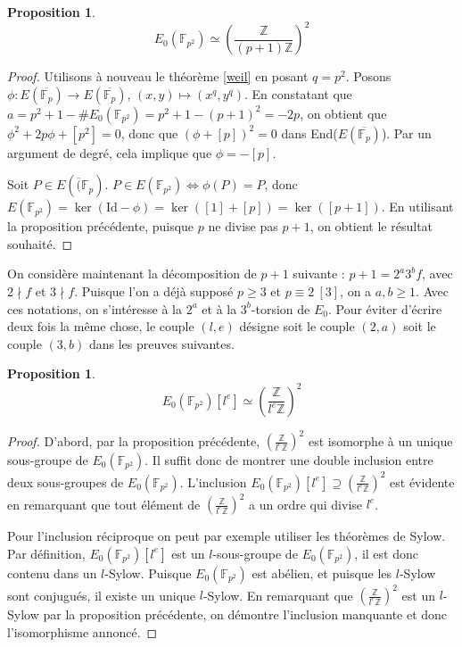 \documentclass{article}
\theoremstyle{plain}%
\newtheorem{prop}[thm]{Proposition}
\theoremstyle{definition}%
\newcommand{\Fq}{\mathbb{F}_{p^2}}
\newcommand{\F}{\mathbb{F}}
\newcommand{\Z}{\mathbb{Z}}
\begin{document}
\begin{prop}
  $$E_0(\F_{p^2}) \simeq \left(  \frac{\Z}{(p+1)\Z} \right)^2$$
\end{prop}
\begin{proof}
  Utilisons à nouveau le théorème \ref{weil} en posant $q = p^2$. 
  Posons $\phi : E(\overline{\F_p}) \to E(\overline{\F_p})$, $\left( x, y \right) \mapsto \left( x^{q}, y^{q} \right)$.
  En constatant que $a=p^2 + 1 - \#E_0(\F_{p^2}) = p^2 + 1 - \left( p + 1 \right) ^2 = -2p$, on obtient que $\phi^2 + 2p\phi + [p^2] = 0$, donc que $\left( \phi + [p] \right) ^2 = 0$ dans End($E(\overline{\F_p})$). 
  Par un argument de degré, cela implique que $\phi = -[p]$. 

  Soit $P\in E(\overline(\F_{p})$. $P \in E(\F_{p^2}) \iff \phi(P) = P$, donc $E(\F_{p^2}) = \ker(\text{Id} - \phi) = \ker([1] + [p]) = \ker([p+1])$.
  En utilisant la proposition précédente, puisque $p$ ne divise pas $p+1$, on obtient le résultat souhaité.
\end{proof}

On considère maintenant la décomposition de $p + 1$ suivante : $p + 1 = 2^a 3^b f$, avec $2 \nmid f$ et $3 \nmid f$. Puisque l'on a déjà supposé $p\ge 3$ et $p \equiv 2\ [3]$, on a $a, b\ge 1$. Avec ces notations, on s'intéresse à la $2^a$ et à la $3^b$-torsion de $E_0$. Pour éviter d'écrire deux fois la même chose, le couple $\left( l, e \right)$ désigne soit le couple $(2, a)$ soit le couple $(3, b)$ dans les preuves suivantes. 

\begin{prop}
  $$E_0(\Fq)[l^e] \simeq \left(  \frac{\Z}{l^e\Z} \right)^2 $$
\end{prop}

\begin{proof}
  D'abord, par la proposition précédente, $\left(  \frac{\Z}{l^e\Z} \right)^2$ est isomorphe à un unique sous-groupe de $E_0(\Fq)$.
  Il suffit donc de montrer une double inclusion entre deux sous-groupes de $E_0(\Fq)$.
  L'inclusion \allowbreak$E_0(\Fq)[l^e] \supseteq \left(\frac{\Z}{l^e\Z} \right)^2$ est évidente en remarquant que tout élément de $\left(  \frac{\Z}{l^e\Z} \right)^2$ a un ordre qui divise $l^e$.
  
  Pour l'inclusion réciproque on peut par exemple utiliser les théorèmes de Sylow. 
  Par définition, $E_0(\Fq)[l^e]$ est un $l$-sous-groupe de $E_0(\Fq)$, il est donc contenu dans un $l$-Sylow. 
  Puisque $E_0(\Fq)$ est abélien, et puisque les $l$-Sylow sont conjugués, il existe un unique $l$-Sylow. 
  En remarquant que $\left(  \frac{\Z}{l^e\Z} \right)^2$ est un $l$-Sylow par la proposition précédente, on démontre l'inclusion manquante et donc l'isomorphisme annoncé. 
\end{proof}
\end{document}
